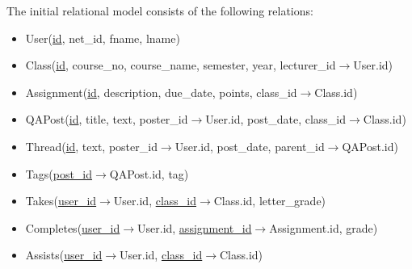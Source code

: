 \documentclass{paper}
\begin{document}
	The initial relational model consists of the following relations:
	\begin{itemize}
		\item User(\underline{id}, net\_id, fname, lname)
		\item Class(\underline{id}, course\_no, course\_name, semester, year, lecturer\_id$\to$User.id)
		\item Assignment(\underline{id}, description, due\_date, points, class\_id$\to$Class.id)
		\item QAPost(\underline{id}, title, text, poster\_id$\to$User.id, post\_date, class\_id$\to$Class.id)
		\item Thread(\underline{id}, text, poster\_id$\to$User.id, post\_date, parent\_id$\to$QAPost.id)
		\item Tags(\underline{post\_id}$\to$QAPost.id, tag)
		\item Takes(\underline{user\_id}$\to$User.id, \underline{class\_id}$\to$Class.id, letter\_grade)
		\item Completes(\underline{user\_id}$\to$User.id, \underline{assignment\_id}$\to$Assignment.id, grade)
		\item Assists(\underline{user\_id}$\to$User.id, \underline{class\_id}$\to$Class.id)
	\end{itemize}
	
\end{document}
